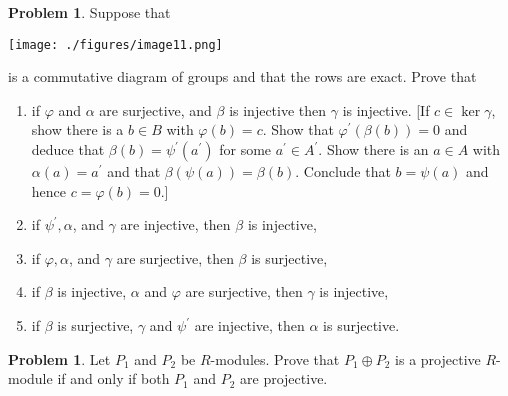 \documentclass{amsart}
\numberwithin{equation}{section}
\theoremstyle{definition}
\newtheorem{problem}[thm]{Problem}
\begin{document}
\begin{problem}
 Suppose that
 \begin{center}
  \texttt{[image: ./figures/image11.png]}
\end{center}
is a commutative diagram of groups and that the rows are exact. Prove that
\begin{enumerate}
\item if \(\varphi\) and \(\alpha\) are surjective, and \(\beta\) is injective then \(\gamma\) is injective. [If \(c \in \operatorname{ker} \gamma\), show there is a \(b \in B\) with \(\varphi(b)=c\). Show that \(\varphi^{\prime}(\beta(b))=0\) and deduce that \(\beta(b)=\psi^{\prime}\left(a^{\prime}\right)\) for some \(a^{\prime} \in A^{\prime}\). Show there is an \(a \in A\) with \(\alpha(a)=a^{\prime}\) and that \(\beta(\psi(a))=\beta(b)\). Conclude that \(b=\psi(a)\) and hence \(c=\varphi(b)=0\).]
\item if \(\psi^{\prime}, \alpha\), and \(\gamma\) are injective, then \(\beta\) is injective,
\item if \(\varphi, \alpha\), and \(\gamma\) are surjective, then \(\beta\) is surjective,
\item if \(\beta\) is injective, \(\alpha\) and \(\varphi\) are surjective, then \(\gamma\) is injective,
\item if \(\beta\) is surjective, \(\gamma\) and \(\psi^{\prime}\) are injective, then \(\alpha\) is surjective.
\end{enumerate}


\end{problem}


\begin{problem}
   Let \(P_1\) and \(P_2\) be \(R\)-modules. Prove that \(P_1 \oplus P_2\) is a projective \(R\)-module if and only if both \(P_1\) and \(P_2\) are projective.
\end{problem}
\end{document}
